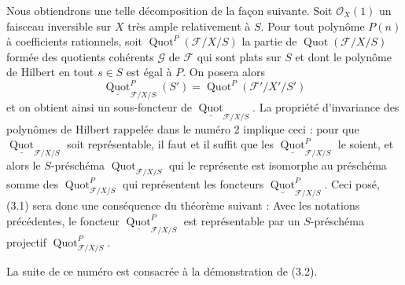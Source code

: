 Nous obtiendrons une telle décomposition de la façon suivante. Soit
$\mathcal O_X(1)$ un faisceau inversible sur $X$ très ample relativement à
$S$. Pour tout polynôme $P(n)$ à coefficients rationnels, soit
$\operatorname{Quot}^P(\mathcal F/X/S)$ la partie de
$\operatorname{Quot}(\mathcal F/X/S)$ formée des quotients cohérents
$\mathcal G$ de $\mathcal F$ qui sont plats sur $S$ et dont le polynôme de
Hilbert en tout $s\in S$ est égal à $P$. On posera alors
\[
\underline{\operatorname{Quot}}^P_{\mathcal F/X/S}(S')
=\operatorname{Quot}^P(\mathcal F'/X'/S')
\]
et on obtient ainsi un sous-foncteur de
$\underline{\operatorname{Quot}}_{\mathcal F/X/S}$. La propriété d'invariance
des polynômes de Hilbert rappelée dans le numéro 2 implique ceci : pour que
$\underline{\operatorname{Quot}}_{\mathcal F/X/S}$ soit représentable, il faut
et il suffit que les
$\underline{\operatorname{Quot}}^P_{\mathcal F/X/S}$ le soient, et alors le
$S$-préschéma $\operatorname{Quot}_{\mathcal F/X/S}$ qui le représente est
isomorphe au préschéma somme des
$\operatorname{Quot}^P_{\mathcal F/X/S}$ qui représentent les foncteurs
$\underline{\operatorname{Quot}}^P_{\mathcal F/X/S}$. Ceci posé, (3.1) sera
donc une conséquence du théorème suivant :
 Avec les notations précédentes, le foncteur
$\underline{\operatorname{Quot}}^P_{\mathcal F/X/S}$ est représentable par un
$S$-préschéma projectif $\operatorname{Quot}^P_{\mathcal F/X/S}$.

La suite de ce numéro est consacrée à la démonstration de (3.2).

